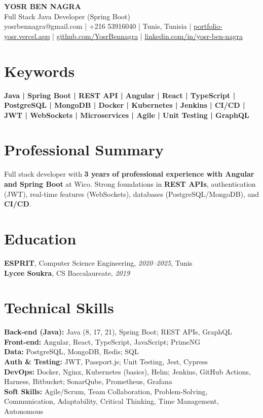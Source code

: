 \documentclass[10pt,a4paper]{article}
\begin{document}
\begin{center}
  {\Large\bfseries YOSR BEN NAGRA}\\[2pt]
  {\small Full Stack Java Developer (Spring Boot)}\\[3pt]
  {\footnotesize yosrbennagra@gmail.com \;|\; +216 53916040 \;|\; Tunis, Tunisia \;|\; \href{https://portfolio-yosr.vercel.app/en}{portfolio-yosr.vercel.app} \;|\; \href{https://github.com/YosrBennagra}{github.com/YosrBennagra} \;|\; \href{https://www.linkedin.com/in/yosr-ben-nagra/}{linkedin.com/in/yosr-ben-nagra}}
\end{center}

\section*{Keywords}
{\small\textbf{
Java | Spring Boot | REST API | Angular | React | TypeScript | PostgreSQL | MongoDB | Docker | Kubernetes | Jenkins | CI/CD | JWT | WebSockets | Microservices | Agile | Unit Testing | GraphQL
}}

\vspace{4pt}

\section*{Professional Summary}
{\small
Full stack developer with \textbf{3 years of professional experience with Angular and Spring Boot} at Wico. Strong foundations in \textbf{REST APIs}, authentication (JWT), real-time features (WebSockets), databases (PostgreSQL/MongoDB), and \textbf{CI/CD}.
}

\vspace{4pt}

\section*{Education}
{\small
\textbf{ESPRIT}, Computer Science Engineering, \textit{2020--2025}, Tunis\\[1pt]
\textbf{Lycee Soukra}, CS Baccalaureate, \textit{2019}
}

\vspace{4pt}

\section*{Technical Skills}
{\small
\textbf{Back-end (Java):} Java (8, 17, 21), Spring Boot; REST APIs, GraphQL\\[2pt]
\textbf{Front-end:} Angular, React, TypeScript, JavaScript; PrimeNG\\[2pt]
\textbf{Data:} PostgreSQL, MongoDB, Redis; SQL\\[2pt]
\textbf{Auth \& Testing:} JWT, Passport.js; Unit Testing, Jest, Cypress\\[2pt]
\textbf{DevOps:} Docker, Nginx, Kubernetes (basics), Helm; Jenkins, GitHub Actions, Harness, Bitbucket; SonarQube, Prometheus, Grafana\\[2pt]
\textbf{Soft Skills:} Agile/Scrum, Team Collaboration, Problem-Solving, Communication, Adaptability, Critical Thinking, Time Management, Autonomous
}
\end{document}
